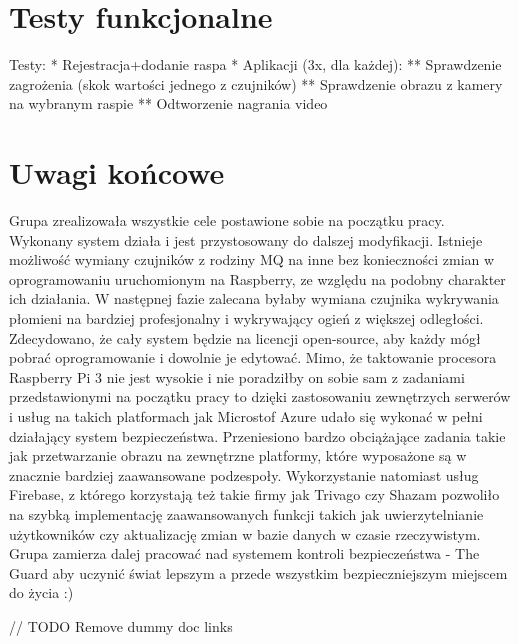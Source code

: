 \chapter{Testy funkcjonalne}

Testy:
 * Rejestracja+dodanie raspa
 * Aplikacji (3x, dla każdej):
 ** Sprawdzenie zagrożenia (skok wartości jednego z czujników)
 ** Sprawdzenie obrazu z kamery na wybranym raspie
 ** Odtworzenie nagrania video

\chapter{Uwagi końcowe}

Grupa zrealizowała wszystkie cele postawione sobie na początku pracy. Wykonany system działa i jest przystosowany do dalszej modyfikacji. Istnieje możliwość wymiany czujników z rodziny MQ na inne bez konieczności zmian w oprogramowaniu uruchomionym na Raspberry, ze względu na podobny charakter ich działania. W następnej fazie zalecana byłaby wymiana czujnika wykrywania płomieni na bardziej profesjonalny i wykrywający ogień z większej odległości. Zdecydowano, że cały system będzie na licencji open-source, aby każdy mógł pobrać oprogramowanie i dowolnie je edytować. Mimo, że taktowanie procesora Raspberry Pi 3 nie jest wysokie i nie poradziłby on sobie sam z zadaniami przedstawionymi na początku pracy to dzięki zastosowaniu zewnętrzych serwerów i usług na takich platformach jak Microstof Azure udało się wykonać w pełni działający system bezpieczeństwa. Przeniesiono bardzo obciążające zadania takie jak przetwarzanie obrazu na zewnętrzne platformy, które wyposażone są w znacznie bardziej zaawansowane podzespoły. Wykorzystanie natomiast usług Firebase, z którego korzystają też takie firmy jak Trivago czy Shazam pozwoliło na szybką implementację zaawansowanych funkcji takich jak uwierzytelnianie użytkowników czy aktualizację zmian w bazie danych w czasie rzeczywistym. Grupa zamierza dalej pracować nad systemem kontroli bezpieczeństwa - The Guard aby uczynić świat lepszym a przede wszystkim bezpieczniejszym miejscem do życia :)


// TODO Remove dummy doc links
\cite{MDESIGN}
\cite{RXJAVA}
\cite{KOTLIN}
\cite{RPI}
\cite{firebase}
\cite{android}
\cite{azure}
\cite{kotlin}